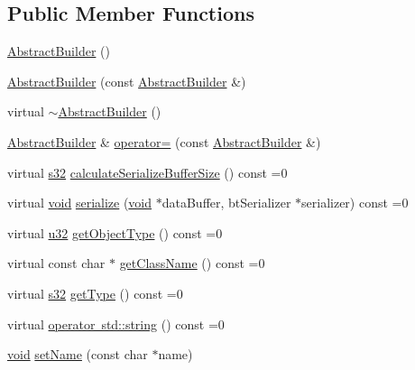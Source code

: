 \subsection*{Public Member Functions}
\begin{DoxyCompactItemize}
\item 
\mbox{\hyperlink{classnjli_1_1_abstract_builder_a0cfdd77fe097b255a5ca29c70675ed0a}{Abstract\+Builder}} ()
\item 
\mbox{\hyperlink{classnjli_1_1_abstract_builder_a5e86ed88487717e88be16728662f2964}{Abstract\+Builder}} (const \mbox{\hyperlink{classnjli_1_1_abstract_builder}{Abstract\+Builder}} \&)
\item 
virtual \mbox{\hyperlink{classnjli_1_1_abstract_builder_a29a886b06975345f3a35d6f7eb49c0ed}{$\sim$\+Abstract\+Builder}} ()
\item 
\mbox{\hyperlink{classnjli_1_1_abstract_builder}{Abstract\+Builder}} \& \mbox{\hyperlink{classnjli_1_1_abstract_builder_aa63d393509ca11a9c624d34781c327fe}{operator=}} (const \mbox{\hyperlink{classnjli_1_1_abstract_builder}{Abstract\+Builder}} \&)
\item 
virtual \mbox{\hyperlink{_util_8h_aa62c75d314a0d1f37f79c4b73b2292e2}{s32}} \mbox{\hyperlink{classnjli_1_1_abstract_builder_aa1d220053e182c37b31b427499c6eacf}{calculate\+Serialize\+Buffer\+Size}} () const =0
\item 
virtual \mbox{\hyperlink{_thread_8h_af1e856da2e658414cb2456cb6f7ebc66}{void}} \mbox{\hyperlink{classnjli_1_1_abstract_builder_ab66b774e02ccb9da554c9aab7fa6d981}{serialize}} (\mbox{\hyperlink{_thread_8h_af1e856da2e658414cb2456cb6f7ebc66}{void}} $\ast$data\+Buffer, bt\+Serializer $\ast$serializer) const =0
\item 
virtual \mbox{\hyperlink{_util_8h_a10e94b422ef0c20dcdec20d31a1f5049}{u32}} \mbox{\hyperlink{classnjli_1_1_abstract_builder_a0f2d344fcf697b167f4f2b1122b5fb33}{get\+Object\+Type}} () const =0
\item 
virtual const char $\ast$ \mbox{\hyperlink{classnjli_1_1_abstract_builder_a902f73ea78031b06aca183a417f3413b}{get\+Class\+Name}} () const =0
\item 
virtual \mbox{\hyperlink{_util_8h_aa62c75d314a0d1f37f79c4b73b2292e2}{s32}} \mbox{\hyperlink{classnjli_1_1_abstract_builder_abb4a8161cd71be12807fe85864b67050}{get\+Type}} () const =0
\item 
virtual \mbox{\hyperlink{classnjli_1_1_abstract_builder_a3e6e553e06d1ca30517ad5fb0bd4d000}{operator std\+::string}} () const =0
\item 
\mbox{\hyperlink{_thread_8h_af1e856da2e658414cb2456cb6f7ebc66}{void}} \mbox{\hyperlink{classnjli_1_1_abstract_builder_a087eb5f8d9f51cc476f12f1d10a3cb95}{set\+Name}} (const char $\ast$name)

\end{DoxyCompactItemize}
